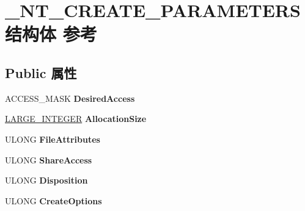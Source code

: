 \hypertarget{struct___n_t___c_r_e_a_t_e___p_a_r_a_m_e_t_e_r_s}{}\section{\+\_\+\+N\+T\+\_\+\+C\+R\+E\+A\+T\+E\+\_\+\+P\+A\+R\+A\+M\+E\+T\+E\+R\+S结构体 参考}
\label{struct___n_t___c_r_e_a_t_e___p_a_r_a_m_e_t_e_r_s}
\subsection*{Public 属性}
\begin{DoxyCompactItemize}
\item 
\mbox{\label{struct___n_t___c_r_e_a_t_e___p_a_r_a_m_e_t_e_r_s_a290d12c8074f1268810439baf731b506}} 
A\+C\+C\+E\+S\+S\+\_\+\+M\+A\+SK {\bfseries Desired\+Access}
\item 
\mbox{\label{struct___n_t___c_r_e_a_t_e___p_a_r_a_m_e_t_e_r_s_a6373c4b3bf7562ceb0526f49d04685e3}} 
\hyperlink{union___l_a_r_g_e___i_n_t_e_g_e_r}{L\+A\+R\+G\+E\+\_\+\+I\+N\+T\+E\+G\+ER} {\bfseries Allocation\+Size}
\item 
\mbox{\label{struct___n_t___c_r_e_a_t_e___p_a_r_a_m_e_t_e_r_s_ad10ca743b4735b120685537eb1ae1ecd}} 
U\+L\+O\+NG {\bfseries File\+Attributes}
\item 
\mbox{\label{struct___n_t___c_r_e_a_t_e___p_a_r_a_m_e_t_e_r_s_aee4e5c78d3ebae585396d7a978842711}} 
U\+L\+O\+NG {\bfseries Share\+Access}
\item 
\mbox{\label{struct___n_t___c_r_e_a_t_e___p_a_r_a_m_e_t_e_r_s_a1e9afd300ed6c89399608fa00cf5e4ae}} 
U\+L\+O\+NG {\bfseries Disposition}
\item 
\mbox{\label{struct___n_t___c_r_e_a_t_e___p_a_r_a_m_e_t_e_r_s_ac9f234519141e49c861149a3236fdb73}} 
U\+L\+O\+NG {\bfseries Create\+Options}
\item 

\end{DoxyCompactItemize}
